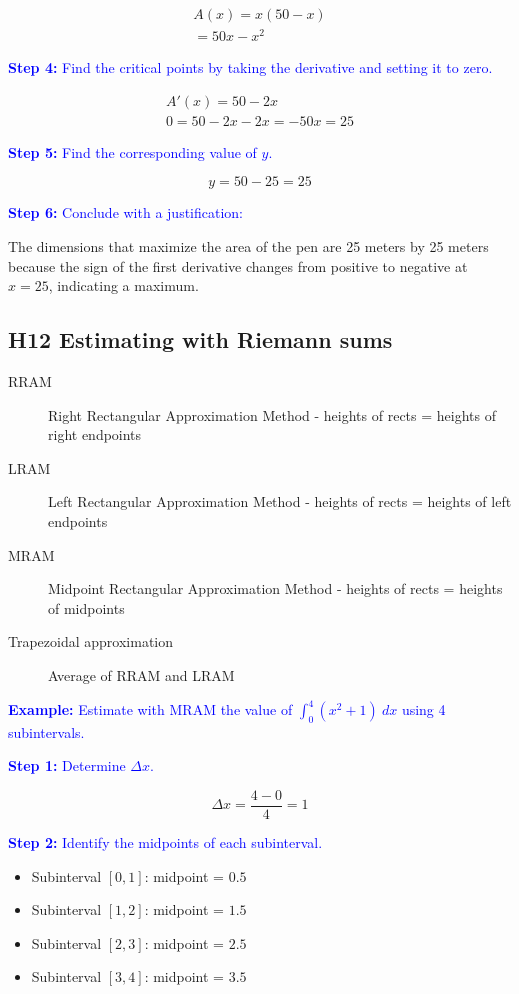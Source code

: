 \documentclass[letterpaper, 12pt]{article}
\newcommand{\example}[1]{\textcolor{blue}{\textbf{Example:} #1}}
\newcommand{\step}[2]{\textcolor{blue}{\textbf{Step #1:} #2}}
\begin{document}
\begin{gather*}
A(x) = x(50 - x) \\
= 50x - x^2
\end{gather*}

\step{4}{Find the critical points by taking the derivative and setting it to zero.}

\begin{gather*}
A'(x) = 50 - 2x \\
0 = 50 - 2x
-2x = -50
x = 25
\end{gather*}

\step{5}{Find the corresponding value of $y$.}

$$y = 50 - 25 = 25$$

\step{6}{Conclude with a justification:}

The dimensions that maximize the area of the pen are 25 meters by 25 meters because the sign of the first derivative changes from positive to negative at $x = 25$, indicating a maximum.

\subsection*{H12 Estimating with Riemann sums}

\begin{description}
\item [RRAM] Right Rectangular Approximation Method - heights of rects = heights of right endpoints
\item [LRAM] Left Rectangular Approximation Method - heights of rects = heights of left endpoints
\item [MRAM] Midpoint Rectangular Approximation Method - heights of rects = heights of midpoints
\item [Trapezoidal approximation] Average of RRAM and LRAM
\end{description}

\example{Estimate with MRAM the value of $\displaystyle \int_{0}^{4} (x^2 + 1) \: dx$ using 4 subintervals.}

\step{1}{Determine $\Delta x$.}

$$\Delta x = \frac{4 - 0}{4} = 1$$

\step{2}{Identify the midpoints of each subinterval.}

\begin{itemize}
\item Subinterval $[0, 1]$: midpoint = $0.5$
\item Subinterval $[1, 2]$: midpoint = $1.5$
\item Subinterval $[2, 3]$: midpoint = $2.5$
\item Subinterval $[3, 4]$: midpoint = $3.5$
\end{itemize}
\end{document}
